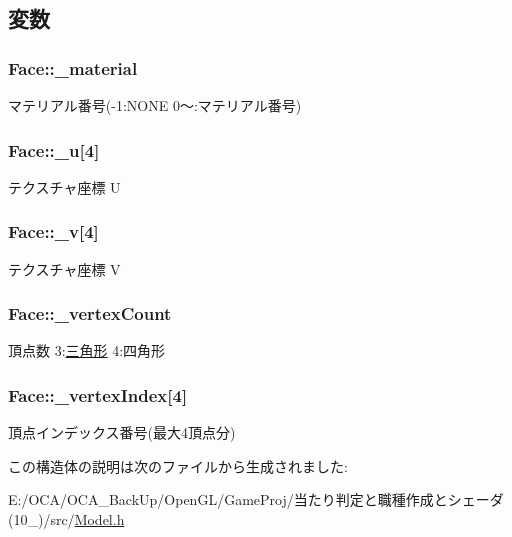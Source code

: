 \subsection{変数}
\hypertarget{struct_face_aa8ce2f4fdf76dcab7a3dbed87ad3fbb1}{
\subsubsection[{\-\_\-material}]{ Face\-::\-\_\-material}}\label{struct_face_aa8ce2f4fdf76dcab7a3dbed87ad3fbb1}


マテリアル番号(-\/1\-:N\-O\-N\-E 0〜\-:マテリアル番号) 

\hypertarget{struct_face_ac67b514483b1fed58ab7d2fc04da56a4}{
\subsubsection[{\-\_\-u}]{ Face\-::\-\_\-u\mbox{[}4\mbox{]}}}\label{struct_face_ac67b514483b1fed58ab7d2fc04da56a4}


テクスチャ座標 U 

\hypertarget{struct_face_a16c195e7ec3ead4c46eb17fd9bb6bf75}{
\subsubsection[{\-\_\-v}]{ Face\-::\-\_\-v\mbox{[}4\mbox{]}}}\label{struct_face_a16c195e7ec3ead4c46eb17fd9bb6bf75}


テクスチャ座標 V 

\hypertarget{struct_face_ae66e1226046adc0fbeaa6db936646a65}{
\subsubsection[{\-\_\-vertex\-Count}]{ Face\-::\-\_\-vertex\-Count}}\label{struct_face_ae66e1226046adc0fbeaa6db936646a65}


頂点数 3\-:\hyperlink{struct_xE4_xB8_x89_xE8_xA7_x92_xE5_xBD_xA2}{三角形} 4\-:四角形 

\hypertarget{struct_face_aceddde235971938cc165b5f7c9440b99}{
\subsubsection[{\-\_\-vertex\-Index}]{ Face\-::\-\_\-vertex\-Index\mbox{[}4\mbox{]}}}\label{struct_face_aceddde235971938cc165b5f7c9440b99}


頂点インデックス番号(最大4頂点分) 



この構造体の説明は次のファイルから生成されました\-:\begin{DoxyCompactItemize}
\item 
E\-:/\-O\-C\-A/\-O\-C\-A\-\_\-\-Back\-Up/\-Open\-G\-L/\-Game\-Proj/当たり判定と職種作成とシェーダ(10\-\_)/src/\hyperlink{_model_8h}{Model.\-h}\end{DoxyCompactItemize}
